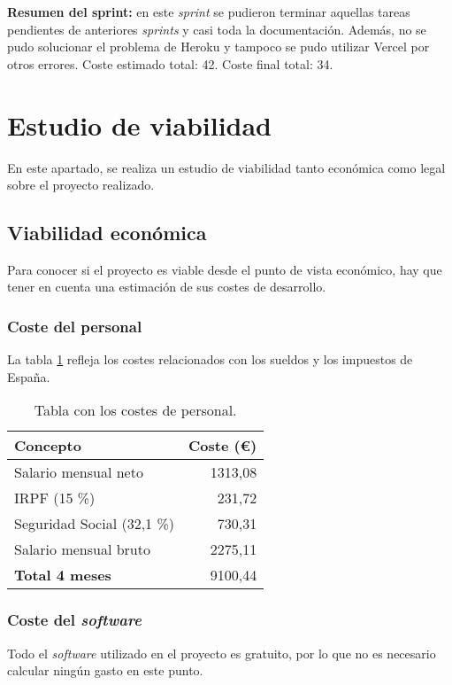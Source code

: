 \textbf{Resumen del sprint:} en este \textit{sprint} se pudieron terminar aquellas tareas pendientes de anteriores \textit{sprints} y casi toda la documentación. Además, no se pudo solucionar el problema de Heroku y tampoco se pudo utilizar Vercel por otros errores. Coste estimado total: 42. Coste final total: 34.

\section{Estudio de viabilidad}
En este apartado, se realiza un estudio de viabilidad tanto económica como legal sobre el proyecto realizado.

\subsection{Viabilidad económica}
Para conocer si el proyecto es viable desde el punto de vista económico, hay que tener en cuenta una estimación de sus costes de desarrollo.

\subsubsection{Coste del personal}
La tabla \ref{tab:coste_personal} refleja los costes relacionados con los sueldos y los impuestos de España.
\begin{table}[h]
	\begin{center}
		\begin{tabular}{ l r }
			\toprule
			\textbf{Concepto} & \textbf{Coste (€)} \\ \midrule
			Salario mensual neto \cite{salario} & 1313,08 \\
			IRPF (15 \%) & 231,72 \\ 
			Seguridad Social (32,1 \%) & 730,31 \\
			Salario mensual bruto & 2275,11 \\ \midrule
			\textbf{Total 4 meses} & 9100,44 \\ \bottomrule
		\end{tabular}
		\caption{Tabla con los costes de personal.}
		\label{tab:coste_personal}
	\end{center}
\end{table}

\subsubsection{Coste del \textit{software}}
Todo el \textit{software} utilizado en el proyecto es gratuito, por lo que no es necesario calcular ningún gasto en este punto.

